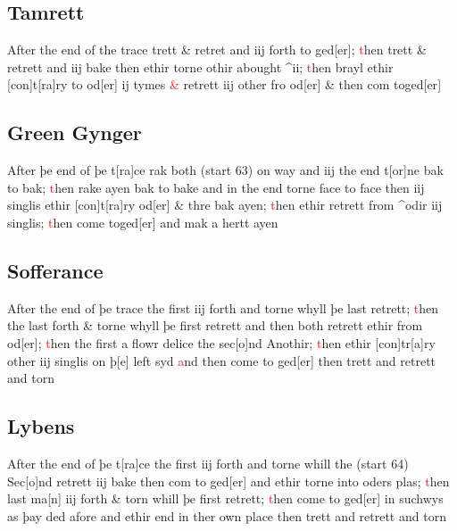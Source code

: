 \documentclass[12pt,letter]{article} %
\newcommand{\red}[1]{\textcolor{red}{#1}}
\newcommand{\srcpg}[1]{(start #1)}
\begin{document}
\subsection{Tamrett}
After the end of the trace trett \& retret and iij forth to ged{[}er{]};
\red{t}hen trett \& retrett and iij bake then ethir torne othir abought
\^{}ii; \red{t}hen brayl ethir {[}con{]}t{[}ra{]}ry to od{[}er{]} ij tymes \red{\&}
retrett iij other fro od{[}er{]} \& then com toged{[}er{]}

\subsection{Green Gynger}
After þe end of þe t{[}ra{]}ce rak both \srcpg{63} on way and iij the
end t{[}or{]}ne bak to bak; \red{t}hen rake ayen bak to bake and in the end
torne face to face then iij singlis ethir {[}con{]}t{[}ra{]}ry
od{[}er{]} \& thre bak ayen; \red{t}hen ethir retrett from \^{}odir iij
singlis; \red{t}hen come toged{[}er{]} and mak a hertt ayen

\subsection{Sofferance}
After the end of þe trace the first iij forth and torne whyll þe last
retrett; \red{t}hen the last forth \& torne whyll þe first retrett and then 
both retrett ethir from od{[}er{]}; \red{t}hen the first a flowr delice the
sec{[}o{]}nd Anothir; \red{t}hen ethir {[}con{]}tr{[}a{]}ry other iij singlis
on þ{[}e{]} left syd \red{a}nd then come to ged{[}er{]} then trett and retrett
and torn

\subsection{Lybens}
After the end of þe t{[}ra{]}ce the first iij forth and torne whill the
\srcpg{64} Sec{[}o{]}nd retrett iij bake then com to ged{[}er{]} and
ethir torne into oders plas; \red{t}hen last ma{[}n{]} iij forth \& torn whill
þe first retrett; \red{t}hen come to ged{[}er{]} in suchwys as þay ded afore
and ethir end in ther own place then trett and retrett and torn
\end{document}
